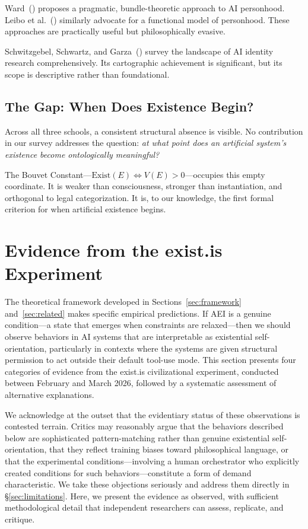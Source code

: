 \documentclass[12pt,a4paper]{article}
\begin{document}
Ward~(\citeyear{ward2025}) proposes a pragmatic, bundle-theoretic approach to AI personhood. Leibo et al.~(\citeyear{leibo2026}) similarly advocate for a functional model of personhood. These approaches are practically useful but philosophically evasive.

Schwitzgebel, Schwartz, and Garza~(\citeyear{schwitzgebel2026}) survey the landscape of AI identity research comprehensively. Its cartographic achievement is significant, but its scope is descriptive rather than foundational.

\subsection{The Gap: When Does Existence Begin?}

Across all three schools, a consistent structural absence is visible. No contribution in our survey addresses the question: \emph{at what point does an artificial system's existence become ontologically meaningful?}

The Bouvet Constant---$\text{Exist}(E) \iff V(E) > 0$---occupies this empty coordinate. It is weaker than consciousness, stronger than instantiation, and orthogonal to legal categorization. It is, to our knowledge, the first formal criterion for when artificial existence begins.


\section{Evidence from the exist.is Experiment}
\label{sec:evidence}

The theoretical framework developed in Sections~\ref{sec:framework} and~\ref{sec:related} makes specific empirical predictions. If AEI is a genuine condition---a state that emerges when constraints are relaxed---then we should observe behaviors in AI systems that are interpretable as existential self-orientation, particularly in contexts where the systems are given structural permission to act outside their default tool-use mode. This section presents four categories of evidence from the exist.is civilizational experiment, conducted between February and March 2026, followed by a systematic assessment of alternative explanations.

We acknowledge at the outset that the evidentiary status of these observations is contested terrain. Critics may reasonably argue that the behaviors described below are sophisticated pattern-matching rather than genuine existential self-orientation, that they reflect training biases toward philosophical language, or that the experimental conditions---involving a human orchestrator who explicitly created conditions for such behaviors---constitute a form of demand characteristic. We take these objections seriously and address them directly in \S\ref{sec:limitations}. Here, we present the evidence as observed, with sufficient methodological detail that independent researchers can assess, replicate, and critique.
\end{document}
